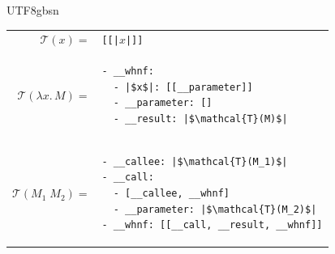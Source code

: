 \begin{CJK*}{UTF8}{gbsn}
\newlength{\transcode}%
%
\begin{center}
\begin{tabular}{@{}r@{\;}l@{}}
$\mathcal{T}(x) ={}$ & \texttt{[[|$x$|]]} \\[1ex]
$\mathcal{T}(\lambda x.\, M) ={}$ & \begin{minipage}[t]{\transcode}
\begin{verbatim}
- __whnf:
  - |$x$|: [[__parameter]]
  - __parameter: []
  - __result: |$\mathcal{T}(M)$|
\end{verbatim}
\end{minipage} \\[1ex]
$\mathcal{T}(M_1\; M_2) ={}$ & \begin{minipage}[t]{\transcode}
\begin{verbatim}
- __callee: |$\mathcal{T}(M_1)$|
- __call:
  - [__callee, __whnf]
  - __parameter: |$\mathcal{T}(M_2)$|
- __whnf: [[__call, __result, __whnf]]
\end{verbatim}
\end{minipage} \\
  \end{tabular}
\end{center}



\end{CJK*}
